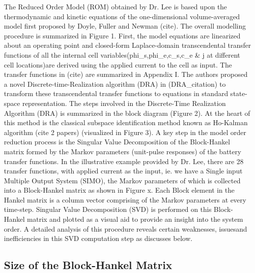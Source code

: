The  Reduced  Order  Model  (ROM)  obtained   by  Dr.  Lee  is  based  upon  the
thermodynamic and kinetic equations of the one-dimensional volume-averaged model
first  proposed  by Doyle,  Fuller  and  Newman  (cite). The  overall  modelling
procedure is summarized  in Figure 1. First, the model  equations are linearized
about an operating point  and closed-form Laplace-domain transcendental transfer
functions  of  all  the  internal cell  variables(phi\_s,phi\_e,c\_s,c\_e  \&  j
at  different  cell locations)are  derived  using  the  applied current  to  the
cell  as input.  The transfer  functions in  (cite) are  summarized in  Appendix
I.  The  authors  proposed  a novel  Discrete-time-Realization  algorithm  (DRA)
in  (DRA\_citation)  to transform  these  transcendental  transfer functions  to
equations  in standard  state-space representation.  The steps  involved in  the
Discrete-Time Realization  Algorithm (DRA)  is summarized  in the  block diagram
(Figure 2). At the heart of this method is the classical subspace identification
method known  as Ho-Kalman algorithm (cite  2 papers) (visualized in  Figure 3).
A  key  step  in  the  model  order reduction  process  is  the  Singular  Value
Decomposition  of  the  Block-Hankel  matrix formed  by  the  Markov  parameters
(unit-pulse responses)  of the battery  transfer functions. In  the illustrative
example  provided by  Dr. Lee,  there are  28 transfer  functions, with  applied
current as the input, ie. we have  a Single input Multiple Output System (SIMO),
the  Markov parameters  of  which is  collected into  a  Block-Hankel matrix  as
shown  in  Figure x.  Each  Block  element in  the  Hankel  matrix is  a  column
vector comprising  of the Markov  parameters at every time-step.  Singular Value
Decomposition (SVD)  is performed on this  Block-Hankel matrix and plotted  as a
visual aid to provide  an insight into the system order.  A detailed analysis of
this procedure reveals certain weaknesses,  issuesand inefficiencies in this SVD
computation step as discusses below.

\subsection{Size of the Block-Hankel Matrix}

